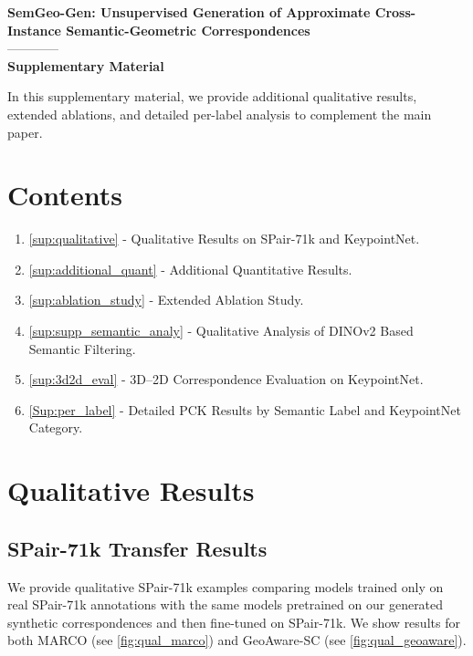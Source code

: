 \begin{center}
{\LARGE \textbf{SemGeo-Gen: Unsupervised Generation of Approximate Cross-Instance Semantic-Geometric Correspondences}}\\[4pt]
{\large ------------}\\[4pt]
{\LARGE \textbf{Supplementary Material}}
\end{center}

\vspace{1em}


In this supplementary material, we provide additional qualitative results, extended ablations, and detailed per-label analysis to complement the main paper.


\section*{Contents}
\begin{enumerate}[]
    \item \autoref{sup:qualitative} - Qualitative Results on SPair-71k and KeypointNet.
\item \autoref{sup:additional_quant} - Additional Quantitative Results.
    \item \autoref{sup:ablation_study} - Extended Ablation Study.
    \item \autoref{sup:supp_semantic_analy} - Qualitative Analysis of DINOv2 Based Semantic Filtering.
    \item \autoref{sup:3d2d_eval} - 3D--2D Correspondence Evaluation on KeypointNet.
    \item \autoref{Sup:per_label} - Detailed PCK Results by Semantic Label and KeypointNet Category.
\end{enumerate}
\clearpage

\section{Qualitative Results}
\label{sup:qualitative}

\subsection{SPair-71k Transfer Results}

We provide qualitative SPair-71k \cite{min2019spair71k} examples comparing models trained only on real SPair-71k annotations with the same models pretrained on our generated synthetic correspondences and then fine-tuned on SPair-71k. We show results for both MARCO \cite{cuttano2026marco} (see \autoref{fig:qual_marco}) and GeoAware-SC \cite{zhang2024tellingLeftFromRight} (see \autoref{fig:qual_geoaware}).


